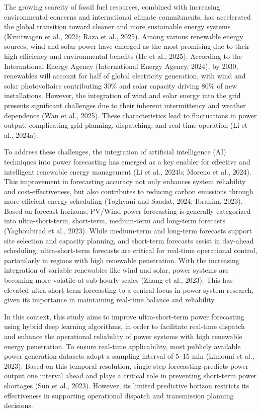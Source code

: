\documentclass[
  10
]{article}
\begin{document}
The growing scarcity of fossil fuel resources, combined with increasing
environmental concerns and international climate commitments, has
accelerated the global transition toward cleaner and more sustainable
energy systems (Kruitwagen et al., 2021; Raza et al., 2025). Among
various renewable energy sources, wind and solar power have emerged as
the most promising due to their high efficiency and environmental
benefits (He et al., 2025). According to the International Energy Agency
(International Energy Agency, 2024), by 2030, renewables will account
for half of global electricity generation, with wind and solar
photovoltaics contributing \(3 0 \%\) and solar capacity driving
\(8 0 \%\) of new installations. However, the integration of wind and
solar energy into the grid presents significant challenges due to their
inherent intermittency and weather dependence (Wan et al., 2025). These
characteristics lead to fluctuations in power output, complicating grid
planning, dispatching, and real-time operation (Li et al., 2024a).

To address these challenges, the integration of artificial intelligence
(AI) techniques into power forecasting has emerged as a key enabler for
effective and intelligent renewable energy management (Li et al., 2024b;
Moreno et al., 2024). This improvement in forecasting accuracy not only
enhances system reliability and cost-effectiveness, but also contributes
to reducing carbon emissions through more efficient energy scheduling
(Toghyani and Saadat, 2024; Ibrahim, 2023). Based on forecast horizons,
PV/Wind power forecasting is generally categorized into
ultra-short-term, short-term, medium-term and long-term forecasts
(Yaghoubirad et al., 2023). While medium-term and long-term forecasts
support site selection and capacity planning, and short-term forecasts
assist in day-ahead scheduling, ultra-short-term forecasts are critical
for real-time operational control, particularly in regions with high
renewable penetration. With the increasing integration of variable
renewables like wind and solar, power systems are becoming more volatile
at sub-hourly scales (Zhang et al., 2023). This has elevated
ultra-short-term forecasting to a central focus in power system
research, given its importance in maintaining real-time balance and
reliability.

In this context, this study aims to improve ultra-short-term power
forecasting using hybrid deep learning algorithms, in order to
facilitate real-time dispatch and enhance the operational reliability of
power systems with high renewable energy penetration. To ensure
real-time applicability, most publicly available power generation
datasets adopt a sampling interval of 5--15 min (Limouni et al., 2023).
Based on this temporal resolution, single-step forecasting predicts
power output one interval ahead and plays a critical role in preventing
short-term power shortages (Sun et al., 2023). However, its limited
predictive horizon restricts its effectiveness in supporting operational
dispatch and transmission planning decisions.
\end{document}
